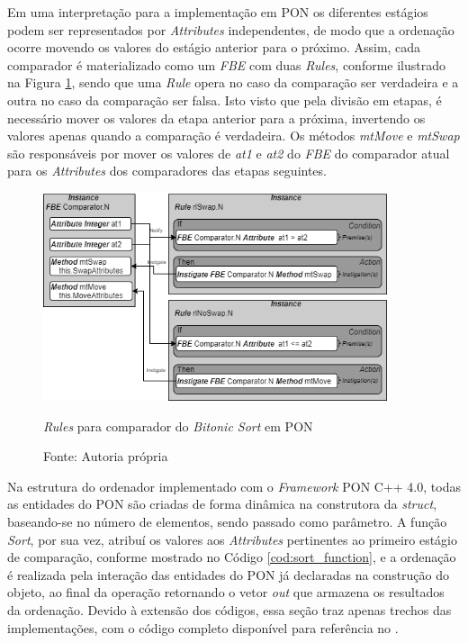 Em uma interpretação para a implementação em PON os diferentes estágios podem
ser representados por \textit{Attributes} independentes, de modo que a ordenação
ocorre movendo os valores do estágio anterior para o próximo. Assim, cada
comparador é materializado como um \textit{FBE} com duas \textit{Rules},
conforme ilustrado na Figura \ref{fig:rule_bitonic}, sendo que uma \textit{Rule}
opera no caso da comparação ser verdadeira e a outra no caso da comparação ser
falsa. Isto visto que pela divisão em etapas, é necessário mover os valores da
etapa anterior para a próxima, invertendo os valores apenas quando a comparação
é verdadeira. Os métodos \textit{mtMove} e \textit{mtSwap} são responsáveis por
mover os valores de \textit{at1} e \textit{at2} do \textit{FBE} do comparador
atual para os \textit{Attributes} dos comparadores das etapas seguintes.

\begin{figure}[!htb]
\centering
\includegraphics[width=0.9\textwidth]{../figures/rule_bitonic.png}
\smallskip
\caption{\textit{Rules} para comparador do \textit{Bitonic Sort} em PON}
\caption*{Fonte: Autoria própria}
\label{fig:rule_bitonic}
\end{figure}

\FloatBarrier

Na estrutura do ordenador implementado com o \textit{Framework} PON C++ 4.0,
todas as entidades do PON são criadas de forma dinâmica na construtora da
\textit{struct}, baseando-se no número de elementos, sendo passado como
parâmetro. A função \textit{Sort}, por sua vez, atribuí os valores aos
\textit{Attributes} pertinentes ao primeiro estágio de comparação, conforme
mostrado no Código \ref{cod:sort_function}, e a ordenação é realizada pela
interação das entidades do PON já declaradas na construção do objeto, ao final
da operação retornando o vetor \textit{out} que armazena os resultados da
ordenação. Devido à extensão dos códigos, essa seção traz apenas trechos das implementações,
com o código completo disponível para referência no .

